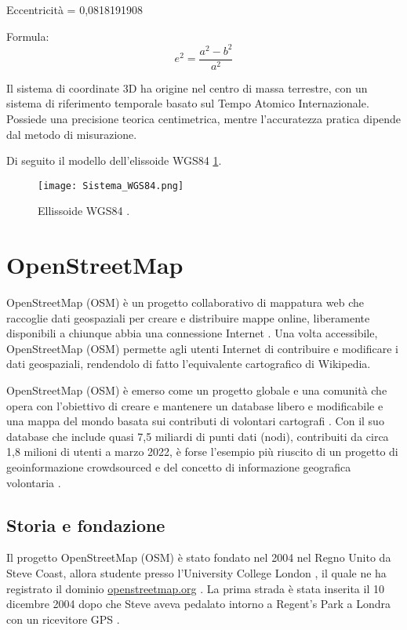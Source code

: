 Eccentricità = 0,0818191908

Formula: 
\begin{equation}
e^2 = \frac{a^2 - b^2}{a^2}
\end{equation}

Il sistema di coordinate 3D ha origine nel centro di massa terrestre, con un sistema di riferimento temporale basato sul Tempo Atomico Internazionale. Possiede una precisione teorica centimetrica, mentre l'accuratezza pratica dipende dal metodo di misurazione.

Di seguito il modello dell'elissoide WGS84 \ref{fig:elissoide-wgs84}.

\begin{figure}[H]
  \centering
  \texttt{[image: Sistema\_WGS84.png]}
  \caption{Ellissoide WGS84 \cite{topgeometri}.}
  \label{fig:elissoide-wgs84}
\end{figure}

\section{OpenStreetMap}

OpenStreetMap (OSM) è un progetto collaborativo di mappatura web che raccoglie dati geospaziali per creare e distribuire mappe online, liberamente disponibili a chiunque abbia una connessione Internet \cite{neis2012}. Una volta accessibile, OpenStreetMap (OSM) permette agli utenti Internet di contribuire e modificare i dati geospaziali, rendendolo di fatto l'equivalente cartografico di Wikipedia.

OpenStreetMap (OSM) è emerso come un progetto globale e una comunità che opera con l'obiettivo di creare e mantenere un database libero e modificabile e una mappa del mondo basata sui contributi di volontari cartografi \cite{fonte2022}. Con il suo database che include quasi 7,5 miliardi di punti dati (nodi), contribuiti da circa 1,8 milioni di utenti a marzo 2022, è forse l'esempio più riuscito di un progetto di geoinformazione crowdsourced e del concetto di informazione geografica volontaria \cite{fonte2022}.

\subsection{Storia e fondazione}

Il progetto OpenStreetMap (OSM) è stato fondato nel 2004 nel Regno Unito da Steve Coast, allora studente presso l'University College London \cite{osmhistory2024}, il quale ne ha registrato il dominio \href{openstreetmap.org}{openstreetmap.org} \cite{osmhistory2024}. La prima strada è stata inserita il 10 dicembre 2004 dopo che Steve aveva pedalato intorno a Regent's Park a Londra con un ricevitore GPS \cite{coast2004}.

